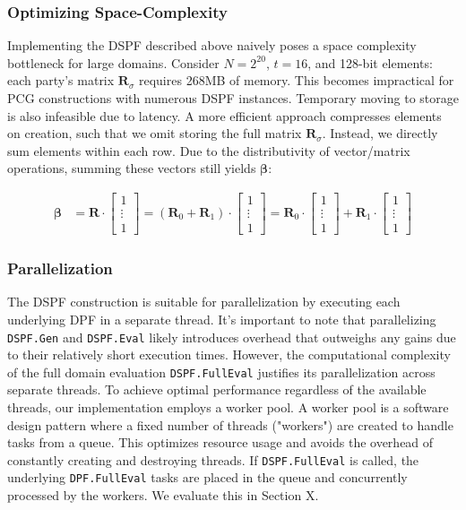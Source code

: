 \subsubsection{Optimizing Space-Complexity}
Implementing the DSPF described above naively poses a space complexity bottleneck for large domains. Consider  $N=2^{20}$, $t=16$, and 128-bit elements: each party's matrix $\boldsymbol{R}_\sigma$ requires 268MB of memory. This becomes impractical for PCG constructions with numerous DSPF instances.  Temporary moving to storage is also infeasible due to latency. A more efficient approach compresses elements on creation, such that we omit storing the full matrix $\boldsymbol{R}_\sigma$. Instead, we directly sum elements within each row. Due to the distributivity of vector/matrix operations, summing these vectors still yields $\boldsymbol{\beta}$:

\begin{equation}
\begin{aligned}
\label{eq:optimizedSpaceCompexity}
\boldsymbol{\beta} &= \boldsymbol{R} \cdot \begin{bmatrix} 1 \\ \vdots \\ 1 \end{bmatrix} = (\boldsymbol{R}_0 + \boldsymbol{R}_1 ) \cdot\begin{bmatrix} 1 \\ \vdots \\ 1 \end{bmatrix} = \boldsymbol{R}_0 \cdot\begin{bmatrix} 1 \\ \vdots \\ 1 \end{bmatrix} + \boldsymbol{R}_1 \cdot\begin{bmatrix} 1 \\ \vdots \\ 1 \end{bmatrix} 
\end{aligned}
\end{equation}

\subsubsection{Parallelization}
The DSPF construction is suitable for parallelization by executing each underlying DPF in a separate thread. It's important to note that parallelizing \texttt{DSPF.Gen} and \texttt{DSPF.Eval}  likely introduces overhead that outweighs any gains due to their relatively short execution times. However, the computational complexity of the full domain evaluation \texttt{DSPF.FullEval} justifies its parallelization across separate threads. To achieve optimal performance regardless of the available threads, our implementation employs a worker pool. A worker pool is a software design pattern where a fixed number of threads ("workers") are created to handle tasks from a queue. This optimizes resource usage and avoids the overhead of constantly creating and destroying threads. If \texttt{DSPF.FullEval} is called, the underlying \texttt{DPF.FullEval} tasks are placed in the queue and concurrently processed by the workers. We evaluate this in Section X.

